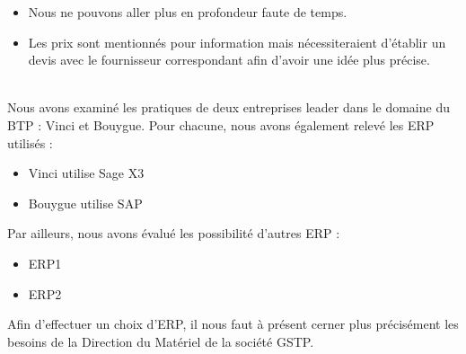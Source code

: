 \documentclass[a4paper]{article}
\begin{document}
\begin{itemize}
\item Nous ne pouvons aller plus en profondeur faute de temps.
\item Les prix sont mentionnés pour information mais nécessiteraient
d'établir un devis avec le fournisseur correspondant afin d'avoir une idée
plus précise.
\end{itemize}

\hfill\\

Nous avons examiné les pratiques de deux entreprises leader dans le domaine
du BTP : Vinci et Bouygue. Pour chacune, nous avons également relevé les
ERP utilisés :

\begin{itemize}
\item Vinci utilise Sage X3
\item Bouygue utilise SAP
\end{itemize}

\vskip 6pt

Par ailleurs, nous avons évalué les possibilité d'autres ERP :
\begin{itemize}
\item ERP1
\item ERP2
\end{itemize}

\vskip 6pt

Afin d'effectuer un choix d'ERP, il nous faut à présent cerner plus
précisément les besoins de la Direction du Matériel de la société GSTP.
\end{document}

